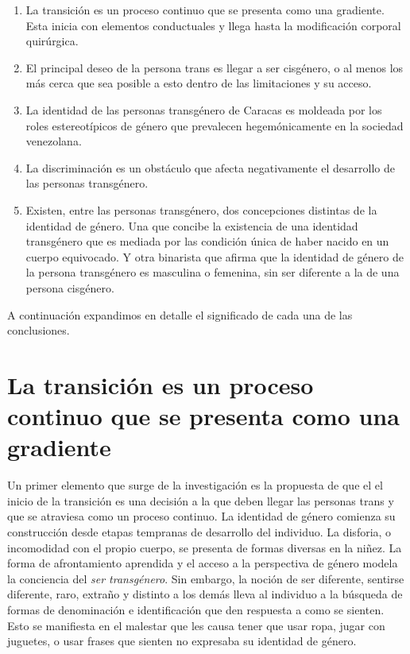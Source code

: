 \begin{enumerate}

  \item La transición es un proceso continuo que se presenta como una gradiente.
  Esta inicia con elementos conductuales y llega hasta la modificación corporal
  quirúrgica.

  \item El principal deseo de la persona trans es llegar a ser cisgénero, o al
  menos los más cerca que sea posible a esto dentro de las limitaciones y su
  acceso.

  \item La identidad de las personas transgénero de Caracas es moldeada por los
  roles estereotípicos de género que prevalecen hegemónicamente en la sociedad
  venezolana.

  \item La discriminación es un obstáculo que afecta negativamente el desarrollo
  de las personas transgénero.

  \item Existen, entre las personas transgénero, dos concepciones distintas de
  la identidad de género. Una que concibe la existencia de una identidad
  transgénero que es mediada por las condición única de haber nacido en un
  cuerpo equivocado. Y otra binarista que afirma que la identidad de género de
  la persona transgénero es masculina o femenina, sin ser diferente a la de una
  persona cisgénero.

\end{enumerate}

A continuación expandimos en detalle el significado de cada una de las
conclusiones.

\section[La transición es un proceso continuo]{La transición es un proceso continuo que se presenta como una gradiente}

Un primer elemento que surge de la investigación es la propuesta de que el el
inicio de la transición es una decisión a la que deben llegar las personas trans
y que se atraviesa como un proceso continuo. La identidad de género comienza su
construcción desde etapas tempranas de desarrollo del individuo. La disforia, o
incomodidad con el propio cuerpo, se presenta de formas diversas en la niñez. La
forma de afrontamiento aprendida y el acceso a la perspectiva de género modela
la conciencia del \emph{ser transgénero}. Sin embargo, la noción de ser
diferente, sentirse diferente, raro, extraño y distinto a los demás lleva al
individuo a la búsqueda de formas de denominación e identificación que den
respuesta a como se sienten. Esto se manifiesta en el malestar que les causa
tener que usar ropa, jugar con juguetes, o usar frases que sienten no expresaba
su identidad de género.

